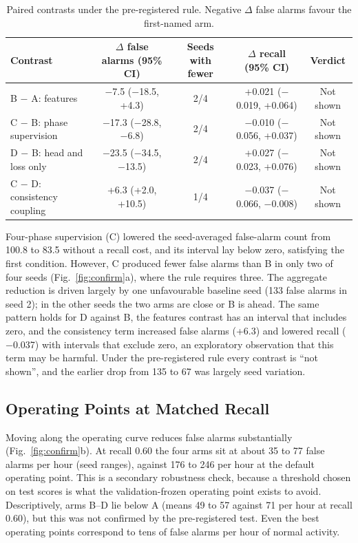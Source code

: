\documentclass[journal]{IEEEtran}
\begin{document}
\begin{table}[!t]
\renewcommand{\arraystretch}{1.15}
\caption{Paired contrasts under the pre-registered rule. Negative $\Delta$ false alarms favour the first-named arm.}
\label{tab:contrasts}
\centering
\footnotesize
\begin{tabular}{p{}cccc}
\hline
Contrast & $\Delta$ false alarms (95\% CI) & Seeds with fewer & $\Delta$ recall (95\% CI) & Verdict \\
\hline
B $-$ A: features & $-$7.5 ($-$18.5, +4.3) & 2/4 & +0.021 ($-$0.019, +0.064) & Not shown \\
C $-$ B: phase supervision & $-$17.3 ($-$28.8, $-$6.8) & 2/4 & $-$0.010 ($-$0.056, +0.037) & Not shown \\
D $-$ B: head and loss only & $-$23.5 ($-$34.5, $-$13.5) & 2/4 & +0.027 ($-$0.023, +0.076) & Not shown \\
C $-$ D: consistency coupling & +6.3 (+2.0, +10.5) & 1/4 & $-$0.037 ($-$0.066, $-$0.008) & Not shown \\
\hline
\end{tabular}
\end{table}


Four-phase supervision (C) lowered the seed-averaged false-alarm count from 100.8 to 83.5 without a recall cost, and its interval lay below zero, satisfying the first condition. However, C produced fewer false alarms than B in only two of four seeds (Fig.~\ref{fig:confirm}a), where the rule requires three. The aggregate reduction is driven largely by one unfavourable baseline seed (133 false alarms in seed 2); in the other seeds the two arms are close or B is ahead. The same pattern holds for D against B, the features contrast has an interval that includes zero, and the consistency term increased false alarms (+6.3) and lowered recall ($-$0.037) with intervals that exclude zero, an exploratory observation that this term may be harmful. Under the pre-registered rule every contrast is ``not shown'', and the earlier drop from 135 to 67 was largely seed variation.


\subsection{Operating Points at Matched Recall}\label{sub:matched}

Moving along the operating curve reduces false alarms substantially (Fig.~\ref{fig:confirm}b). At recall 0.60 the four arms sit at about 35 to 77 false alarms per hour (seed ranges), against 176 to 246 per hour at the default operating point. This is a secondary robustness check, because a threshold chosen on test scores is what the validation-frozen operating point exists to avoid. Descriptively, arms B--D lie below A (means 49 to 57 against 71 per hour at recall 0.60), but this was not confirmed by the pre-registered test. Even the best operating points correspond to tens of false alarms per hour of normal activity.
\end{document}
